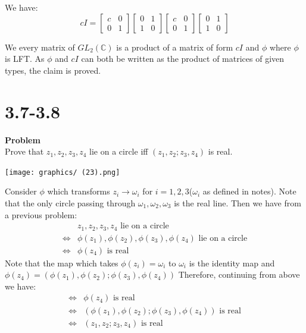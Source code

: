 \documentclass[12pt,oneside]{book}
\begin{document}
We have:
$$cI=\begin{bmatrix}
    c &0\\
    0 &1
\end{bmatrix}\begin{bmatrix}
    0 &1\\
    1 &0
\end{bmatrix}\begin{bmatrix}
    c &0\\
    0 &1
\end{bmatrix}\begin{bmatrix}
    0 &1\\
    1 &0
\end{bmatrix}$$

We every matrix of $GL_2(\mathbb C)$ is a product of a matrix of form $cI$ and $\phi$ where $\phi$ is LFT. As $\phi$ and $cI$ can both be written as the product of matrices of given types, the claim is proved. 

\section{3.7-3.8}

\begin{tcolorbox}[colback=blue!15]
    \textbf{Problem}\\
    Prove that $z_1,z_2,z_3,z_4$ lie on a circle iff $(z_1,z_2;z_3,z_4)$ is real.
\end{tcolorbox}
\begin{marginfigure}%
    \texttt{[image: graphics/ (23).png]}
\end{marginfigure}%
Consider $\phi$ which transforms $z_i\to\omega_i$ for $i=1,2,3$($\omega_i$ as defined in notes). Note that the only circle passing through $\omega_1,\omega_2,\omega_3$ is the real line. Then we have from a previous problem:  
\begin{align*}
    &z_1,z_2,z_3,z_4 \text{ lie on a circle}\\
    \Leftrightarrow& \phi(z_1),\phi(z_2),\phi(z_3),\phi(z_4) \text{ lie on a circle}\\
    \Leftrightarrow& \phi(z_4)\text{ is real}
\end{align*}
Note that the map which takes $\phi(z_i)=\omega_i$ to $\omega_i$ is the identity map and $\phi(z_4)=(\phi(z_1),\phi(z_2);\phi(z_3),\phi(z_4))$ Therefore, continuing from above we have:
\begin{align*}
    \Leftrightarrow& \phi(z_4)\text{ is real}\\
    \Leftrightarrow& (\phi(z_1),\phi(z_2);\phi(z_3),\phi(z_4))\text{ is real}\\
    \Leftrightarrow& (z_1,z_2;z_3,z_4)\text{ is real}\\
\end{align*}
\end{document}
